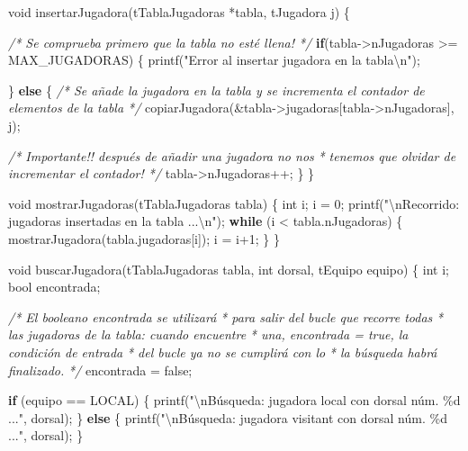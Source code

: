 \documentclass[
]{book}
\newenvironment{Shaded}{\begin{snugshade}}{\end{snugshade}}
\newcommand{\CommentTok}[1]{\textcolor[rgb]{0.56,0.35,0.01}{\textit{#1}}}
\newcommand{\ControlFlowTok}[1]{\textcolor[rgb]{0.13,0.29,0.53}{\textbf{#1}}}
\newcommand{\DataTypeTok}[1]{\textcolor[rgb]{0.13,0.29,0.53}{#1}}
\newcommand{\DecValTok}[1]{\textcolor[rgb]{0.00,0.00,0.81}{#1}}
\newcommand{\NormalTok}[1]{#1}
\newcommand{\SpecialCharTok}[1]{\textcolor[rgb]{0.00,0.00,0.00}{#1}}
\newcommand{\StringTok}[1]{\textcolor[rgb]{0.31,0.60,0.02}{#1}}
\begin{document}
\begin{Shaded}
\begin{Highlighting}[]
\DataTypeTok{void}\NormalTok{ insertarJugadora(tTablaJugadoras *tabla, tJugadora j) \{}
    
    \CommentTok{/* Se comprueba primero que la tabla no esté llena! */}
    \ControlFlowTok{if}\NormalTok{(tabla{-}\textgreater{}nJugadoras \textgreater{}= MAX\_JUGADORAS) \{}
\NormalTok{        printf(}\StringTok{"Error al insertar jugadora en la tabla}\SpecialCharTok{\textbackslash{}n}\StringTok{"}\NormalTok{);}
        
\NormalTok{    \} }\ControlFlowTok{else}\NormalTok{ \{}
        \CommentTok{/* Se añade la jugadora en la tabla y se incrementa}
\CommentTok{           el contador de elementos de la tabla */}
\NormalTok{        copiarJugadora(\&tabla{-}\textgreater{}jugadoras[tabla{-}\textgreater{}nJugadoras], j);}
        
        \CommentTok{/* Importante!! después de añadir una jugadora no nos}
\CommentTok{         * tenemos que olvidar de incrementar el contador! */}
\NormalTok{        tabla{-}\textgreater{}nJugadoras++;}
\NormalTok{    \}}
\NormalTok{\}}

\DataTypeTok{void}\NormalTok{ mostrarJugadoras(tTablaJugadoras tabla) \{}
    \DataTypeTok{int}\NormalTok{ i;}
\NormalTok{    i = }\DecValTok{0}\NormalTok{;}
\NormalTok{    printf(}\StringTok{"}\SpecialCharTok{\textbackslash{}n}\StringTok{Recorrido: jugadoras insertadas en la tabla ...}\SpecialCharTok{\textbackslash{}n}\StringTok{"}\NormalTok{);}
    \ControlFlowTok{while}\NormalTok{ (i \textless{} tabla.nJugadoras) \{}
\NormalTok{        mostrarJugadora(tabla.jugadoras[i]);}
\NormalTok{        i = i+}\DecValTok{1}\NormalTok{;}
\NormalTok{    \}}
\NormalTok{\}}

\DataTypeTok{void}\NormalTok{ buscarJugadora(tTablaJugadoras tabla, }\DataTypeTok{int}\NormalTok{ dorsal, tEquipo equipo) \{}
    \DataTypeTok{int}\NormalTok{ i;}
    \DataTypeTok{bool}\NormalTok{ encontrada;}
    
    \CommentTok{/* El booleano \textquotesingle{}encontrada\textquotesingle{} se utilizará}
\CommentTok{     * para salir del bucle que recorre todas}
\CommentTok{     * las jugadoras de la tabla: cuando encuentre}
\CommentTok{     * una, encontrada = true, la condición de entrada}
\CommentTok{     * del bucle ya no se cumplirá con lo}
\CommentTok{     * la búsqueda habrá finalizado.}
\CommentTok{     */}
\NormalTok{    encontrada = false;}
    
    \ControlFlowTok{if}\NormalTok{ (equipo == LOCAL) \{}
\NormalTok{        printf(}\StringTok{"}\SpecialCharTok{\textbackslash{}n}\StringTok{Búsqueda: jugadora local con dorsal núm. \%d ..."}\NormalTok{, dorsal);}
\NormalTok{    \} }\ControlFlowTok{else}\NormalTok{ \{}
\NormalTok{        printf(}\StringTok{"}\SpecialCharTok{\textbackslash{}n}\StringTok{Búsqueda: jugadora visitant con dorsal núm. \%d ..."}\NormalTok{, dorsal);}
\NormalTok{    \}}
    

\end{Highlighting}
\end{Shaded}
\end{document}
